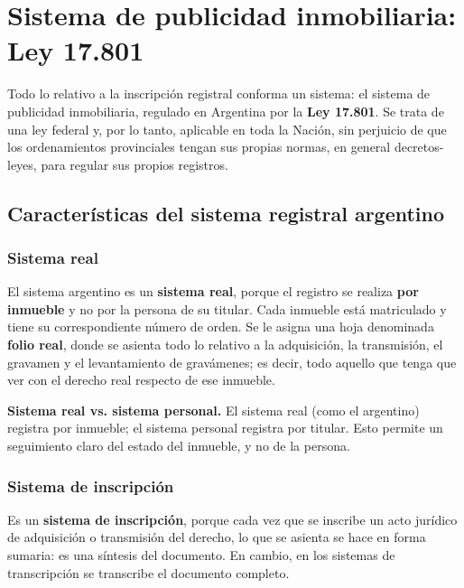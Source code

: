 \documentclass[12pt,oneside]{book}
\begin{document}
\chapter{Sistema de publicidad inmobiliaria: Ley 17.801}

Todo lo relativo a la inscripción registral conforma un sistema: el sistema de publicidad inmobiliaria, regulado en Argentina por la \textbf{Ley 17.801}. Se trata de una ley federal y, por lo tanto, aplicable en toda la Nación, sin perjuicio de que los ordenamientos provinciales tengan sus propias normas, en general decretos-leyes, para regular sus propios registros.

\section{Características del sistema registral argentino}

\subsection{Sistema real}

El sistema argentino es un \textbf{sistema real}, porque el registro se realiza \textbf{por inmueble} y no por la persona de su titular. Cada inmueble está matriculado y tiene su correspondiente número de orden. Se le asigna una hoja denominada \textbf{folio real}, donde se asienta todo lo relativo a la adquisición, la transmisión, el gravamen y el levantamiento de gravámenes; es decir, todo aquello que tenga que ver con el derecho real respecto de ese inmueble.

\begin{important}
\textbf{Sistema real vs. sistema personal.} El sistema real (como el argentino) registra por inmueble; el sistema personal registra por titular. Esto permite un seguimiento claro del estado del inmueble, y no de la persona.
\end{important}

\subsection{Sistema de inscripción}

Es un \textbf{sistema de inscripción}, porque cada vez que se inscribe un acto jurídico de adquisición o transmisión del derecho, lo que se asienta se hace en forma sumaria: es una síntesis del documento. En cambio, en los sistemas de transcripción se transcribe el documento completo.
\end{document}
